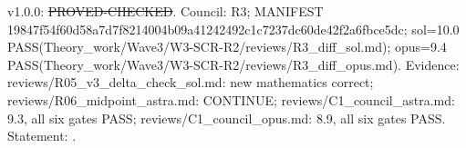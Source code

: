 \begin{corollary}\label{reg:W3-SCR_SCR-G}
\end{corollary}
\begin{statusbox}
 v1.0.0: \st{PROVED-CHECKED}. Council: R3; MANIFEST 19847f54f60d58a7d7f8214004b09a41242492c1c7237dc60de42f2a6fbce5dc; sol=10.0 PASS(Theory\_work/Wave3/W3-SCR-R2/reviews/R3\_diff\_sol.md); opus=9.4 PASS(Theory\_work/Wave3/W3-SCR-R2/reviews/R3\_diff\_opus.md). Evidence: reviews/R05\_v3\_delta\_check\_sol.md: new mathematics correct; reviews/R06\_midpoint\_astra.md: CONTINUE; reviews/C1\_council\_astra.md: 9.3, all six gates PASS; reviews/C1\_council\_opus.md: 8.9, all six gates PASS. Statement: .
\end{statusbox}
